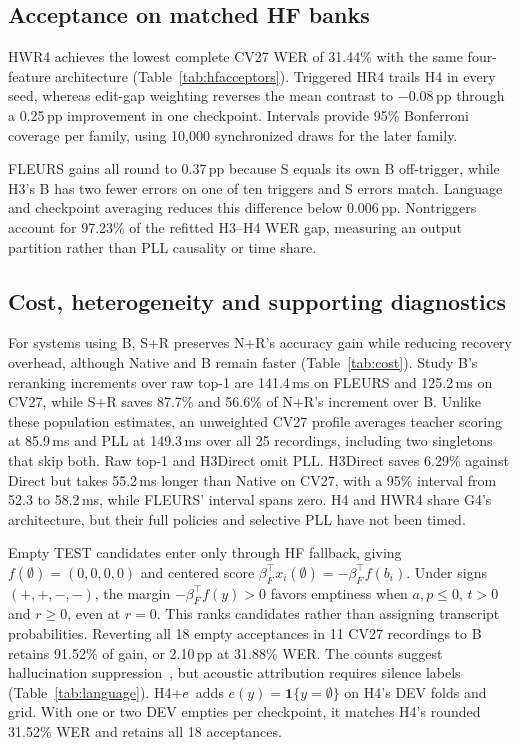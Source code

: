 \subsection{Acceptance on matched HF banks}

HWR4 achieves the lowest complete CV27 WER of 31.44\% with the same four-feature architecture (Table~\ref{tab:hfacceptors}). Triggered HR4 trails H4 in every seed, whereas edit-gap weighting reverses the mean contrast to $-0.08$\,pp through a 0.25\,pp improvement in one checkpoint. Intervals provide 95\% Bonferroni coverage per family, using 10,000 synchronized draws for the later family.

FLEURS gains all round to 0.37\,pp because S equals its own B off-trigger, while H3's B has two fewer errors on one of ten triggers and S errors match. Language and checkpoint averaging reduces this difference below 0.006\,pp. Nontriggers account for 97.23\% of the refitted H3--H4 WER gap, measuring an output partition rather than PLL causality or time share.

\subsection{Cost, heterogeneity and supporting diagnostics}

For systems using B, S+R preserves N+R's accuracy gain while reducing recovery overhead, although Native and B remain faster (Table~\ref{tab:cost}). Study B's reranking increments over raw top-1 are 141.4\,ms on FLEURS and 125.2\,ms on CV27, while S+R saves 87.7\% and 56.6\% of N+R's increment over B. Unlike these population estimates, an unweighted CV27 profile averages teacher scoring at 85.9\,ms and PLL at 149.3\,ms over all 25 recordings, including two singletons that skip both. Raw top-1 and H3Direct omit PLL. H3Direct saves 6.29\% against Direct but takes 55.2\,ms longer than Native on CV27, with a 95\% interval from 52.3 to 58.2\,ms, while FLEURS' interval spans zero. H4 and HWR4 share G4's architecture, but their full policies and selective PLL have not been timed.


Empty TEST candidates enter only through HF fallback, giving $f(\emptyset)=(0,0,0,0)$ and centered score $\beta_F^\top x_i(\emptyset)=-\beta_F^\top f(b_i)$. Under signs $(+,+,-,-)$, the margin $-\beta_F^\top f(y)>0$ favors emptiness when $a,p\le0$, $t>0$ and $r\ge0$, even at $r=0$. This ranks candidates rather than assigning transcript probabilities. Reverting all 18 empty acceptances in 11 CV27 recordings to B retains 91.52\% of gain, or 2.10\,pp at 31.88\% WER. The counts suggest hallucination suppression~\cite{baranski2025nonspeech}, but acoustic attribution requires silence labels (Table~\ref{tab:language}). \mbox{H4+$e$ adds} $e(y)=\mathbf1\{y=\emptyset\}$ on H4's DEV folds and grid. With one or two DEV empties per checkpoint, it matches H4's rounded 31.52\% WER and retains all 18 acceptances.

